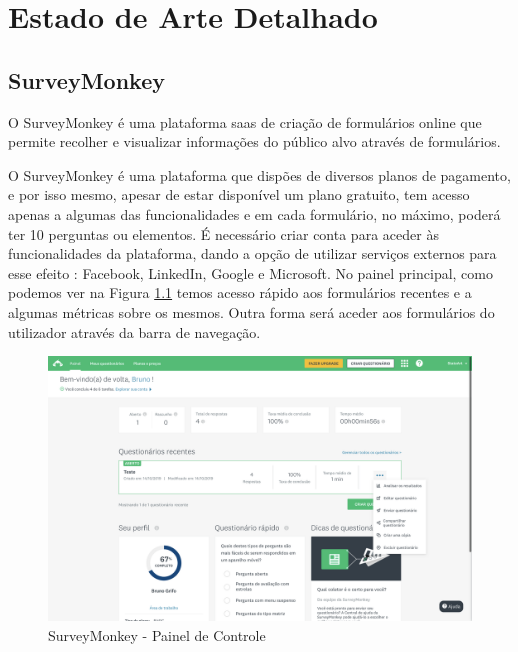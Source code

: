\chapter{Estado de Arte Detalhado}
\label{a:ea}

\section{SurveyMonkey}
\label{surveyMonkey}

O SurveyMonkey é uma plataforma \acrfull{saas} de criação de formulários online que permite recolher e visualizar informações do público alvo através de formulários.

O SurveyMonkey é uma plataforma que dispões de diversos planos de pagamento, e por isso mesmo, apesar de estar disponível um plano gratuito, tem acesso apenas a algumas das funcionalidades e em cada formulário, no máximo, poderá ter 10 perguntas ou elementos.
É necessário criar conta para aceder às funcionalidades da plataforma, dando a opção de utilizar serviços externos para esse efeito : Facebook\cite{face}, LinkedIn, Google\cite{gaccount} e Microsoft\cite{microsoft}.
No painel principal, como podemos ver na Figura \ref{fig:survey-dashboard} temos acesso rápido aos formulários recentes e a algumas métricas sobre os mesmos. Outra forma será aceder aos formulários do utilizador através da barra de navegação. 


\begin{figure}[ht!]
	\begin{center}
		\includegraphics[width=1\textwidth]{img/sm/survey-dashboard}
		\caption{SurveyMonkey - Painel de Controle }
		\label{fig:survey-dashboard}
	\end{center}
\end{figure}

